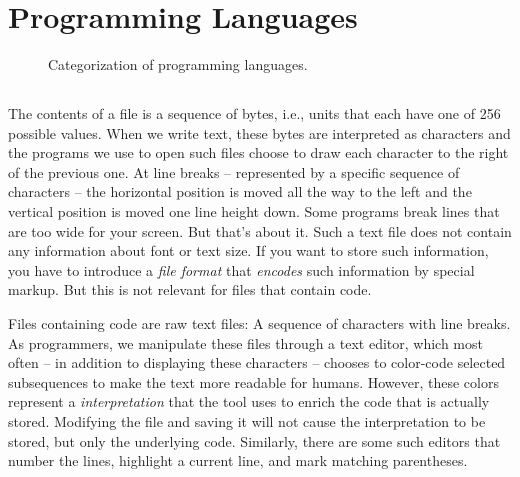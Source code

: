 \section{Programming Languages}
\label{sec:lang}

\begin{inspiration}{\cite{progLangJurassicPark}}
\end{inspiration}

\begin{figure}[tbp]
  
  \caption{Categorization of programming languages.}
  \label{fig:background:lang:categorization}
\end{figure}

\subsection{}

The contents of a file is a sequence of bytes, i.e., units that each have one of 256 possible values. When we write text, these bytes are interpreted as characters and the programs we use to open such files choose to draw each character to the right of the previous one. At line breaks -- represented by a specific sequence of characters -- the horizontal position is moved all the way to the left and the vertical position is moved one line height down. Some programs break lines that are too wide for your screen. But that's about it. Such a text file does not contain any information about font or text size. If you want to store such information, you have to introduce a \textsl{file format} that \textsl{encodes} such information by special markup. But this is not relevant for files that contain code.

Files containing code are raw text files: A sequence of characters with line breaks. As programmers, we manipulate these files through a text editor, which most often -- in addition to displaying these characters -- chooses to color-code selected subsequences to make the text more readable for humans. However, these colors represent a \textsl{interpretation} that the tool uses to enrich the code that is actually stored. Modifying the file and saving it will not cause the interpretation to be stored, but only the underlying code. Similarly, there are some such editors that number the lines, highlight a current line, and mark matching parentheses.


